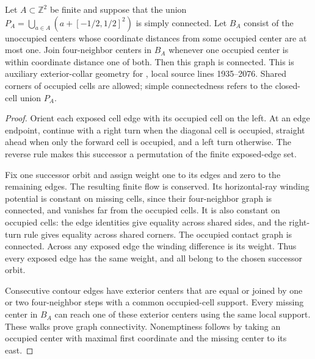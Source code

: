 \begin{lemma}%
    \label{thm:peps_integer_boundary_contour_connected}
    \leanok
    Let $A\subset\mathbb Z^2$ be finite and suppose that the union
    $P_A=\bigcup_{a\in A}(a+[-1/2,1/2]^2)$ is simply connected.
    Let $B_A$ consist of the unoccupied centers whose coordinate distances
    from some occupied center are at most one. Join four-neighbor centers
    in $B_A$ whenever one occupied center is within coordinate distance
    one of both. Then this graph is connected.
    This is auxiliary exterior-collar geometry for
    \cite[proof of Theorem~6.9]{Schuch2010PEPS}, local source lines
    1935--2076. Shared corners of occupied cells are allowed; simple
    connectedness refers to the closed-cell union $P_A$.
\end{lemma}

\begin{proof}\leanok
    Orient each exposed cell edge with its occupied cell on the left.
    At an edge endpoint, continue with a right turn when the diagonal
    cell is occupied, straight ahead when only the forward cell is
    occupied, and a left turn otherwise. The reverse rule makes this
    successor a permutation of the finite exposed-edge set.

    Fix one successor orbit and assign weight one to its edges and zero
    to the remaining edges. The resulting finite flow is conserved.
    Its horizontal-ray winding potential is constant on missing cells,
    since their four-neighbor graph is connected, and vanishes far from
    the occupied cells. It is also constant on occupied cells: the edge
    identities give equality across shared sides, and the right-turn
    rule gives equality across shared corners. The occupied contact
    graph is connected. Across any exposed edge the winding difference
    is its weight. Thus every exposed edge has the same weight, and all
    belong to the chosen successor orbit.

    Consecutive contour edges have exterior centers that are equal or
    joined by one or two four-neighbor steps with a common occupied-cell
    support. Every missing center in $B_A$ can reach one of these
    exterior centers using the same local support. These walks prove
    graph connectivity. Nonemptiness follows by taking an occupied
    center with maximal first coordinate and the missing center to its east.
\end{proof}
